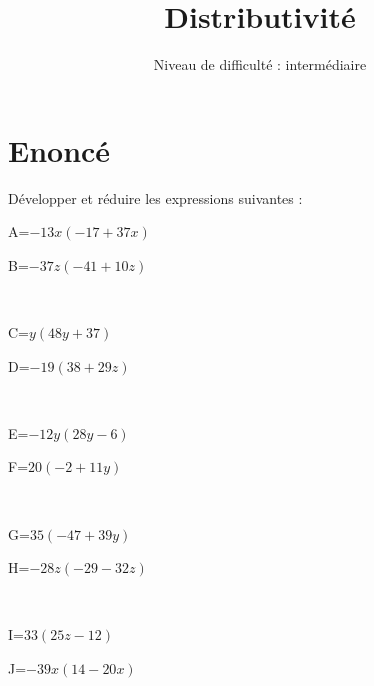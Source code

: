 \documentclass{article}%
\title{Distributivité}%
\author{Niveau de difficulté : intermédiaire}%
\date{{}}%
\begin{document}
%
\normalsize%
\pagestyle{empty}%
\maketitle%
\section{Enoncé}%
\label{sec:Enonc}%
Développer et réduire les expressions suivantes :%
\newline%
%
\newline%
%
\begin{minipage}{0.5\textwidth}%
A=$-13x(-17+37x)$\\%
\end{minipage}%
\begin{minipage}{0.5\textwidth}%
B=$-37z(-41+10z)$\\%
\end{minipage}%
\\%
\begin{minipage}{0.5\textwidth}%
C=$y(48y+37)$\\%
\end{minipage}%
\begin{minipage}{0.5\textwidth}%
D=$-19(38+29z)$\\%
\end{minipage}%
\\%
\begin{minipage}{0.5\textwidth}%
E=$-12y(28y-6)$\\%
\end{minipage}%
\begin{minipage}{0.5\textwidth}%
F=$20(-2+11y)$\\%
\end{minipage}%
\\%
\begin{minipage}{0.5\textwidth}%
G=$35(-47+39y)$\\%
\end{minipage}%
\begin{minipage}{0.5\textwidth}%
H=$-28z(-29-32z)$\\%
\end{minipage}%
\\%
\begin{minipage}{0.5\textwidth}%
I=$33(25z-12)$\\%
\end{minipage}%
\begin{minipage}{0.5\textwidth}%
J=$-39x(14-20x)$\\%
\end{minipage}%
\end{document}
